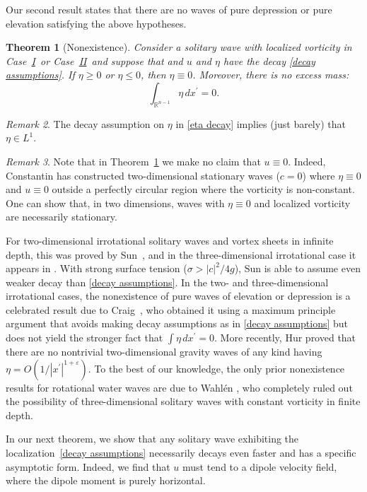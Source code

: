 \documentclass[11pt,reqno]{amsart}
\newcommand{\I}{\texorpdfstring{\hyperref[sec non-singular]{I}}{I}}
\newcommand{\VS}{\texorpdfstring{\hyperref[sec sheets]{II}}{II}}
\newcommand{\R}{\mathbb{R}}
\newcommand{\abs}[2][]{#1\lvert #2 #1\rvert}
\theoremstyle{plain}
\newtheorem{theorem}{Theorem}[section]
\theoremstyle{remark}
\newtheorem{remark}[theorem]{Remark}
\numberwithin{equation}{section}
\begin{document}
Our second result states that there are no waves of pure depression or pure elevation satisfying the above hypotheses.  
\begin{theorem}[Nonexistence] \label{no excess mass theorem}  
  Consider a solitary wave with localized vorticity 
in Case~\I\ or Case~\VS\ and suppose that and $u$ and $\eta$ have the decay \eqref{decay assumptions}. 
  If $\eta \geq 0$ or $\eta \leq 0$, then $\eta \equiv 0$.  Moreover, there is no excess mass:
  \[ 
  \int_{\R^{n-1}} \eta \, dx^\prime = 0.  
  \]
\end{theorem}
\begin{remark} \label{L1 remark}
  The decay assumption on $\eta$ in \eqref{eta decay} implies (just barely) that $\eta \in L^1$.
\end{remark}
\begin{remark} \label{trivial remark}
  Note that in Theorem~\ref{no excess mass theorem} we make no claim that $u \equiv 0$. Indeed, Constantin \cite{constantin2011dynamical} has constructed two-dimensional stationary waves ($c=0$) where $\eta \equiv 0$ and $u \equiv 0$ outside a perfectly circular region where the vorticity is non-constant. One can show that, in two dimensions, waves with $\eta \equiv 0$ and localized vorticity
  are necessarily stationary.
\end{remark}

For two-dimensional irrotational solitary waves and vortex sheets in infinite depth, this was proved by Sun~\cite{sun1997analytical}, and in the three-dimensional irrotational case it appears in \cite{wheeler2016integral}.  With strong surface tension ($\sigma > \abs c^2/4g$), Sun is able to assume even weaker decay than \eqref{decay assumptions}.
In the two- and three-dimensional irrotational cases, the nonexistence of pure waves of elevation or depression is a celebrated result due to Craig~\cite{craig2002nonexistence}, who obtained it using a maximum principle argument that avoids making decay assumptions as in \eqref{decay assumptions} but does not yield the stronger fact that $\int \eta \, dx^\prime = 0$.   More recently, Hur \cite{hur2012no} proved that there are no nontrivial two-dimensional gravity waves of any kind having $\eta = O(1/|x^\prime|^{1+\varepsilon})$.  To the best of our knowledge, the only prior nonexistence results for rotational water waves are due to Wahl\'en \cite{wahlen2014non}, who completely ruled out the possibility of three-dimensional solitary waves with constant vorticity in finite depth.
 
In our next theorem, we show that any solitary wave exhibiting the localization~\eqref{decay assumptions} necessarily decays even faster and has a specific asymptotic form.
Indeed, we find that $u$ must tend to a dipole velocity field, where the dipole moment is purely horizontal. 
\end{document}
